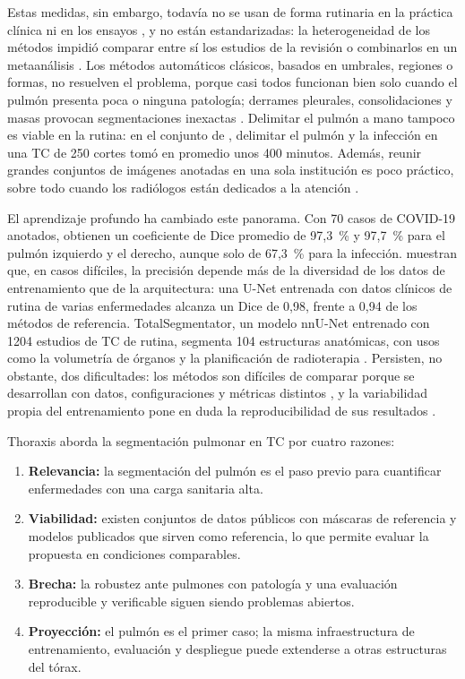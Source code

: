 Estas medidas, sin embargo, todavía no se usan de forma rutinaria en la
práctica clínica ni en los ensayos \parencite{thillai2024}, y no están
estandarizadas: la heterogeneidad de los métodos impidió comparar entre sí los
estudios de la revisión o combinarlos en un metaanálisis \parencite{dixon2025}.
Los métodos automáticos clásicos, basados en umbrales, regiones o formas, no
resuelven el problema, porque casi todos funcionan bien solo cuando el pulmón
presenta poca o ninguna patología; derrames pleurales, consolidaciones y masas
provocan segmentaciones inexactas \parencite{mansoor2015}. Delimitar el pulmón
a mano tampoco es viable en la rutina: en el conjunto de \textcite{ma2021},
delimitar el pulmón y la infección en una TC de 250 cortes tomó en promedio
unos 400 minutos. Además, reunir grandes conjuntos de imágenes anotadas en una
sola institución es poco práctico, sobre todo cuando los radiólogos están
dedicados a la atención \parencite{ma2021}.

El aprendizaje profundo ha cambiado este panorama. Con 70 casos de COVID-19
anotados, \textcite{ma2021} obtienen un coeficiente de Dice promedio de 97,3~\%
y 97,7~\% para el pulmón izquierdo y el derecho, aunque solo de 67,3~\% para la
infección. \textcite{hofmanninger2020} muestran que, en casos difíciles, la
precisión depende más de la diversidad de los datos de entrenamiento que de la
arquitectura: una U-Net entrenada con datos clínicos de rutina de varias
enfermedades alcanza un Dice de 0,98, frente a 0,94 de los métodos de
referencia. TotalSegmentator, un modelo nnU-Net entrenado con 1204 estudios de
TC de rutina, segmenta 104 estructuras anatómicas, con usos como la volumetría de órganos y la planificación de
radioterapia \parencite{wasserthal2023}. Persisten, no obstante, dos
dificultades: los métodos son difíciles de comparar porque se desarrollan con
datos, configuraciones y métricas distintos \parencite{ma2021}, y la
variabilidad propia del entrenamiento pone en duda la reproducibilidad de sus
resultados \parencite{renard2020}.

Thoraxis aborda la segmentación pulmonar en TC por cuatro razones:

\begin{enumerate}
    \item \textbf{Relevancia:} la segmentación del pulmón es el paso previo
          para cuantificar enfermedades con una carga sanitaria alta.
    \item \textbf{Viabilidad:} existen conjuntos de datos públicos con máscaras
          de referencia y modelos publicados que sirven como referencia, lo
          que permite evaluar la propuesta en condiciones comparables.
    \item \textbf{Brecha:} la robustez ante pulmones con patología y una
          evaluación reproducible y verificable siguen siendo problemas
          abiertos.
    \item \textbf{Proyección:} el pulmón es el primer caso; la misma
          infraestructura de entrenamiento, evaluación y despliegue puede
          extenderse a otras estructuras del tórax.
\end{enumerate}

